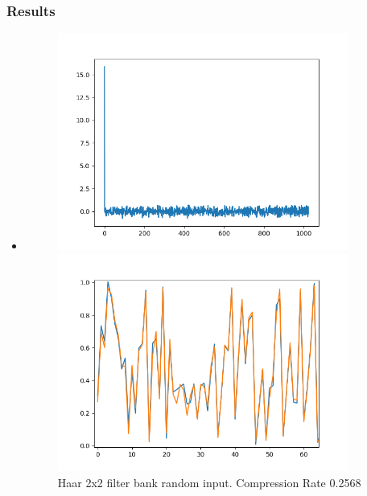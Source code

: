 \documentclass{beamer}
\begin{document}
\begin{frame}
    \frametitle{Results}
    \begin{itemize}
        \item
              \begin{figure}[ht!]
                  \centering
                  \begin{minipage}{0.45\textwidth}
                      \centering
                      \includegraphics[width=0.9\textwidth]{fig/HaarAugmented1D_freq.png} %
                      \caption{Haar 2x2 filter bank random input. Compression Rate 0.2568}
                      \label{fig:Haar}
                  \end{minipage}\hfill
                  \begin{minipage}{0.45\textwidth}
                      \centering
                      \includegraphics[width=0.9\textwidth]{fig/HaarAugmented1D_rec.png} %

\end{minipage}
\end{figure}
\end{itemize}
\end{frame}
\end{document}
